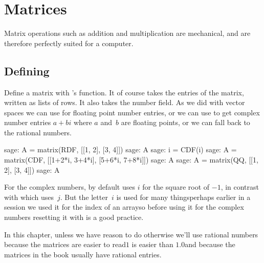 \chapter{Matrices}

Matrix operations such as addition and multiplication
are mechanical, and are therefore perfectly suited for 
a computer.



\section{Defining}
Define a matrix with \Sage's  function.
It of course takes the entries of the matrix, written as lists of rows.
It also takes the number field.
As we did with vector spaces we can use  for 
floating point number entries, 
or we can use  to get complex number entries $a+bi$ where 
$a$ and~$b$ are floating points,
or we can fall back to the rational numbers.
\begin{sagecommandline}
sage: A = matrix(RDF, [[1, 2], [3, 4]])
sage: A
sage: i = CDF(i)
sage: A = matrix(CDF, [[1+2*i, 3+4*i], [5+6*i, 7+8*i]])
sage: A
sage: A = matrix(QQ, [[1, 2], [3, 4]])
sage: A                           
\end{sagecommandline}
\noindent
For the complex numbers,
by default \Sage{} uses $i$ for the square root of $-1$, in contrast with 
\python{} which uses~$j$.
But the letter~$i$ is used for many things\Dash perhaps earlier in 
a session we used it for the index of an array\Dash so before using it
for the complex numbers
resetting it with  is a good practice.

In this chapter, unless we have reason to do otherwise
we'll use rational numbers because the matrices are easier to 
read\Dash $1$ is easier than $1.0$\Dash and 
because the matrices in the book usually have rational entries.

